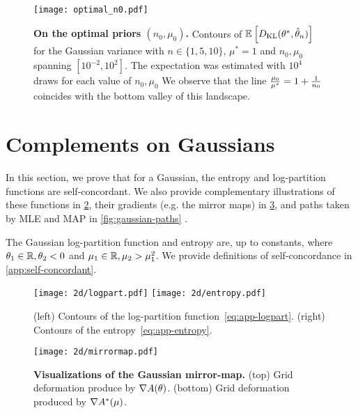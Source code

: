 \begin{subappendices}
\begin{figure}[ht]
	\centering
	\texttt{[image: optimal\_n0.pdf]}
	\caption[On the optimal priors $(n_0, \mu_0)$.]{
	\textbf{On the optimal priors $(n_0, \mu_0)$.}
	Contours of $\mathbb{E}_{} \left[ D_{\mathrm{KL}}(\theta^*, \hat {\theta}_n) \right] $  for the Gaussian variance with $n\in\{1,5,10\}$, $\mu^*=1$ and $n_0, \mu_0$ spanning $[10^{-2}, 10^2]$. The expectation was estimated with $10^4$ draws for each value of $n_0, \mu_0$ We observe that the line $\frac{\mu_0}{\mu^*} = 1 + \frac{1}{n_0}$ coincides with the bottom valley of this landscape.
	}
	\label{fig:optimal_n0}
\end{figure}


\section{Complements on Gaussians}
\label{app:gaussian}


In this section, we prove that for a Gaussian, the entropy and log-partition functions are self-concordant.
We also provide complementary illustrations of 
these functions in \cref{fig:logpart-entropy}, 
their gradients (e.g. the mirror maps) in \cref{fig:mirrormaps},
and paths taken by MLE and MAP in \cref{fig:gaussian-paths} .

The Gaussian log-partition function and entropy are, up to constants,
where $\theta_1\in\mathbb{R}, \theta_2 <0$ and $\mu_1\in\mathbb{R}, \mu_2>\mu_1^2$.
We provide definitions of self-concordance in \cref{app:self-concordant}.

\begin{figure}[ht]
	\centering
	\texttt{[image: 2d/logpart.pdf]}
	\texttt{[image: 2d/entropy.pdf]}
	\caption[Contours of the Gaussian log-partition function and entropy.]{
	(left) Contours of the log-partition function~\eqref{eq:app-logpart}.
	(right) Contours of the entropy~\eqref{eq:app-entropy}.
	}
	\label{fig:logpart-entropy}
\end{figure}

\begin{figure}[ht]
	\centering
	\texttt{[image: 2d/mirrormap.pdf]}
	\caption[Visualizations of the Gaussian mirror-map.]{
	\textbf{Visualizations of the Gaussian mirror-map.}
	(top) Grid deformation produce by $\nabla A(\theta)$.
	(bottom) Grid deformation produced by $\nabla{A^*}(\mu)$.
	}
	\label{fig:mirrormaps}
\end{figure}


\end{subappendices}
